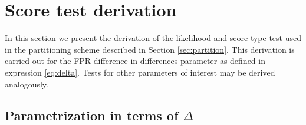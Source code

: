 \documentclass[11pt, sigconf, svgnames]{acmart}
\begin{document}


%
%




 


\appendix


\section{Score test derivation} \label{appendix:likelihood}

In this section we present the derivation of the likelihood and score-type test used in the partitioning scheme described in Section \ref{sec:partition}.  This derivation is carried out for the FPR difference-in-differences parameter as defined in expression \eqref{eq:delta}.  Tests for other parameters of interest may be derived analogously.  


\subsection*{Parametrization in terms of $\Delta$}
\end{document}
